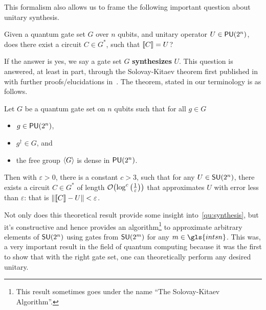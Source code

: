 This formalism also allows us to frame the following important question about unitary synthesis.
\begin{question}\label{qu:synthesis}
    Given a quantum gate set $G$ over $n$ qubits, and unitary operator $U \in \mathsf{PU} (2^n)$, does there exist a circuit $C\in G^*$, such that $\llbracket C\rrbracket = U$?
\end{question}
If the answer is yes, we say a gate set $G$ \textbf{synthesizes} $U$.
This question is answered, at least in part, through the Solovay-Kitaev theorem first published in~\cite{bigkitaev} with further proofs/elucidations in~\cite{nielsenchuang,solovay-kitaev,kitaev-book}.
The theorem, stated in our terminology is as follows.
\begin{theorem}\label{thm:solovaykitaev}
    Let $G$ be a quantum gate set on $n$ qubits such that for all $g \in G$
    \begin{itemize}
        \item $g \in \mathsf{PU} (2^n)$,
        \item $g^\dagger \in G$, and
        \item the free group $\expval{G}$ is dense in $\mathsf{PU} (2^n)$.
    \end{itemize}
    Then with $\varepsilon > 0$, there is a constant $c > 3$, such that for any $U \in \mathsf{SU} (2^n)$, there exists a circuit $C \in G^*$ of length $\order{\log^c\qty(\frac{1}{\varepsilon})}$ that approximates $U$ with error less than $\varepsilon$: that is $\norm{\llbracket C\rrbracket - U} < \varepsilon$.
\end{theorem}
Not only does this theoretical result provide some insight into~\ref{qu:synthesis}, but it's constructive and hence provides an algorithm\footnote{This result sometimes goes under the name ``The Solovay-Kitaev Algorithm''.} to approximate arbitrary elements of $\mathsf{SU} (2^n)$ using gates from $\mathsf{SU} (2^m)$ for any $m \in \gls{intsn}$.
This was, a very important result in the field of quantum computing because it was the first to show that with the right gate set, one can theoretically perform any desired unitary.

